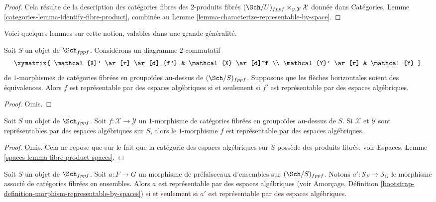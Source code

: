 \begin{proof}
Cela résulte de la description des catégories fibres des $2$-produits fibrés
$(\Sch/U)_{fppf} \times_{y, \mathcal{Y}} \mathcal{X}$ donnée dans
Catégories, Lemme \ref{categories-lemma-identify-fibre-product},
combinée au
Lemme \ref{lemma-characterize-representable-by-space}.
\end{proof}

\noindent
Voici quelques lemmes sur cette notion, valables dans une grande généralité.

\begin{lemma}
\label{lemma-representable-by-spaces-morphism-equivalent}
Soit $S$ un objet de $\Sch_{fppf}$.
Considérons un diagramme $2$-commutatif
$$
\xymatrix{
\mathcal{X}' \ar[r] \ar[d]_{f'} & \mathcal{X} \ar[d]^f \\
\mathcal{Y}' \ar[r] & \mathcal{Y}
}
$$
de $1$-morphismes de catégories fibrées en groupoïdes au-dessus de
$(\Sch/S)_{fppf}$.
Supposons que les flèches horizontales soient des équivalences.
Alors $f$ est représentable par des espaces algébriques
si et seulement si $f'$ est représentable par des espaces algébriques.
\end{lemma}

\begin{proof}
Omis.
\end{proof}

\begin{lemma}
\label{lemma-morphism-spaces-gives-representable-by-spaces}
Soit $S$ un objet de $\Sch_{fppf}$.
Soit $f : \mathcal{X} \to \mathcal{Y}$
un $1$-morphisme de catégories fibrées en groupoïdes au-dessus de $S$.
Si $\mathcal{X}$ et $\mathcal{Y}$ sont représentables par des
espaces algébriques sur $S$, alors le $1$-morphisme $f$
est représentable par des espaces algébriques.
\end{lemma}

\begin{proof}
Omis. Cela ne repose que sur le fait que
la catégorie des espaces algébriques sur $S$ possède des produits fibrés,
voir Espaces, Lemme \ref{spaces-lemma-fibre-product-spaces}.
\end{proof}

\begin{lemma}
\label{lemma-map-presheaves-representable-by-algebraic-spaces}
Soit $S$ un objet de $\Sch_{fppf}$.
Soit $a : F \to G$ un morphisme de préfaisceaux d'ensembles sur $(\Sch/S)_{fppf}$.
Notons $a' : \mathcal{S}_F  \to \mathcal{S}_G$ le morphisme associé
de catégories fibrées en ensembles.
Alors $a$ est représentable par des espaces algébriques (voir
Amorçage,
Définition \ref{bootstrap-definition-morphism-representable-by-spaces})
si et seulement si $a'$ est représentable par des espaces algébriques.
\end{lemma}

